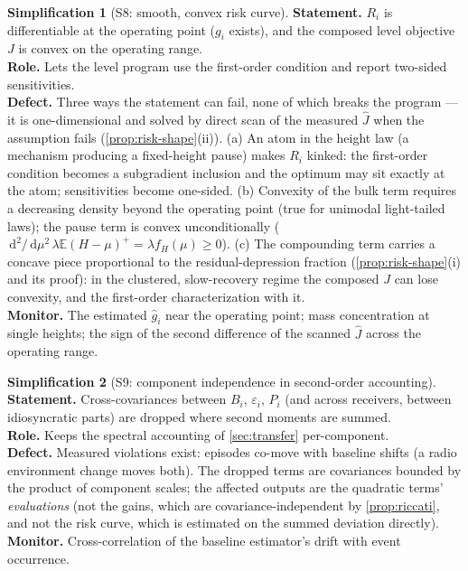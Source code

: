\documentclass[11pt, a4paper]{article}
\theoremstyle{definition}
\newtheorem{simplification}{Simplification}
\theoremstyle{plain}
\theoremstyle{remark}
\newcommand{\E}{\mathbb{E}}
\newcommand{\dd}{\,\mathrm{d}}
\newcommand{\pos}[1]{\left(#1\right)^{\!+}}
\begin{document}
\begin{simplification}[S8: smooth, convex risk curve]
\label{simp:smooth}
\textbf{Statement.}  $R_i$ is differentiable at the operating point
($g_i$ exists), and the composed level objective $J$ is convex on the
operating range.\\
\textbf{Role.}  Lets the level program use the first-order condition
and report two-sided sensitivities.\\
\textbf{Defect.}  Three ways the statement can fail, none of which
breaks the program --- it is one-dimensional and solved by direct
scan of the measured $\hat J$ when the assumption fails
(\cref{prop:risk-shape}(ii)).  (a) An atom in the height law (a
mechanism producing a fixed-height pause) makes $R_i$ kinked: the
first-order condition becomes a subgradient inclusion and the optimum
may sit exactly at the atom; sensitivities become one-sided.
(b) Convexity of the bulk term requires a decreasing density beyond
the operating point (true for unimodal light-tailed laws); the pause
term is convex unconditionally
($\dd^2/\dd\mu^2\,\lambda\E\pos{H-\mu} = \lambda f_H(\mu) \ge 0$).
(c) The compounding term carries a concave piece proportional to the
residual-depression fraction (\cref{prop:risk-shape}(i) and its
proof): in the clustered, slow-recovery regime the composed $J$ can
lose convexity, and the first-order characterization with it.\\
\textbf{Monitor.}  The estimated $\hat g_i$ near the operating point;
mass concentration at single heights; the sign of the second
difference of the scanned $\hat J$ across the operating range.
\end{simplification}

\begin{simplification}[S9: component independence in second-order
accounting]\label{simp:independence}
\textbf{Statement.}  Cross-covariances between $B_i$, $\varepsilon_i$,
$P_i$ (and across receivers, between idiosyncratic parts) are dropped
where second moments are summed.\\
\textbf{Role.}  Keeps the spectral accounting of \cref{sec:transfer}
per-component.\\
\textbf{Defect.}  Measured violations exist: episodes co-move with
baseline shifts (a radio environment change moves both).  The dropped
terms are covariances bounded by the product of component scales; the
affected outputs are the quadratic terms' \emph{evaluations} (not the
gains, which are covariance-independent by \cref{prop:riccati}, and
not the risk curve, which is estimated on the summed deviation
directly).\\
\textbf{Monitor.}  Cross-correlation of the baseline estimator's drift
with event occurrence.
\end{simplification}
\end{document}
